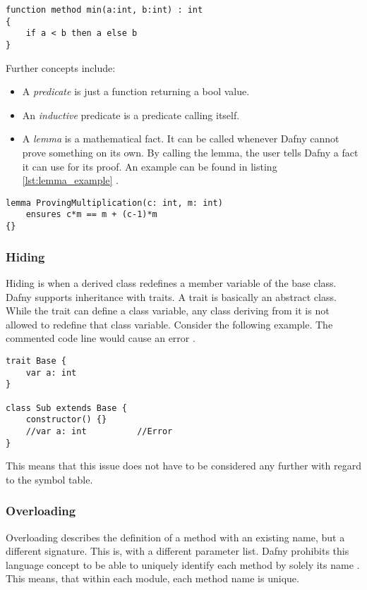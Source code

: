 \begin{lstlisting}[language=dafny, caption={Function Method Example}, captionpos=b, label={lst:function}]
function method min(a:int, b:int) : int
{
    if a < b then a else b
}
\end{lstlisting}

Further concepts include:
\begin{itemize}
\item A \textit{predicate} is just a function returning a bool value.
\item An \textit{inductive} predicate is a predicate calling itself.
\item A \textit{lemma} is a mathematical fact.
It can be called whenever Dafny cannot prove something on its own.
By calling the lemma, the user tells Dafny a fact it can use for its proof.
An example can be found in listing \ref{lst:lemma_example} \cite{dafnyReferenceManual}.
\end{itemize}

\begin{lstlisting}[language=dafny, caption={Lemma}, captionpos=b, label={lst:lemma_example}]
lemma ProvingMultiplication(c: int, m: int)
    ensures c*m == m + (c-1)*m
{}
\end{lstlisting}

\subsubsection{Hiding}
Hiding is when a derived class redefines a member variable of the base class.
Dafny supports inheritance with traits.
A trait is basically an abstract class.
While the trait can define a class variable, any class deriving from it is not allowed to redefine that class variable.
Consider the following example.
The commented code line would cause an error \cite{dafnyReferenceManual}.

\begin{lstlisting}[language=dafny, caption={Hiding}, captionpos=b, label={lst:hiding}]
trait Base {
    var a: int
}

class Sub extends Base {
    constructor() {}
    //var a: int          //Error
}
\end{lstlisting}

This means that this issue does not have to be considered any further with regard to the symbol table.

\subsubsection{Overloading}
Overloading describes the definition of a method with an existing name, but a different signature.
This is, with a different parameter list.
Dafny prohibits this language concept to be able to uniquely identify each method by solely its name \cite{dafnyReferenceManual}.
This means, that within each module, each method name is unique.


